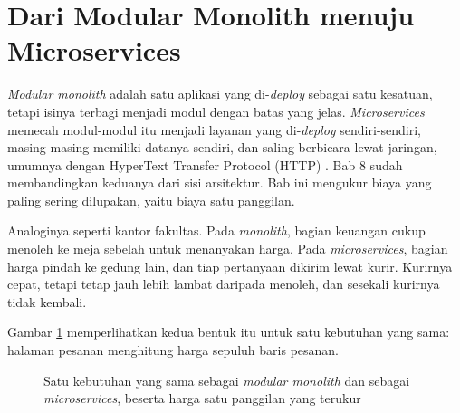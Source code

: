 \section{Dari Modular Monolith menuju Microservices}

\textit{Modular monolith} adalah satu aplikasi yang di-\textit{deploy}
sebagai satu kesatuan, tetapi isinya terbagi menjadi modul dengan batas yang
jelas. \textit{Microservices} memecah modul-modul itu menjadi layanan yang
di-\textit{deploy} sendiri-sendiri, masing-masing memiliki datanya sendiri,
dan saling berbicara lewat jaringan, umumnya dengan HyperText Transfer
Protocol (HTTP) \cite{newman2021microservices}. Bab 8
sudah membandingkan keduanya dari sisi arsitektur. Bab ini mengukur biaya yang
paling sering dilupakan, yaitu biaya satu panggilan.

Analoginya seperti kantor fakultas. Pada \textit{monolith}, bagian keuangan
cukup menoleh ke meja sebelah untuk menanyakan harga. Pada
\textit{microservices}, bagian harga pindah ke gedung lain, dan tiap
pertanyaan dikirim lewat kurir. Kurirnya cepat, tetapi tetap jauh lebih lambat
daripada menoleh, dan sesekali kurirnya tidak kembali.

Gambar \ref{fig:pecah14} memperlihatkan kedua bentuk itu untuk satu
kebutuhan yang sama: halaman pesanan menghitung harga sepuluh baris pesanan.

\begin{figure}[!htb]
  \centering
  \caption{Satu kebutuhan yang sama sebagai \textit{modular monolith} dan
           sebagai \textit{microservices}, beserta harga satu panggilan yang
           terukur}
  \label{fig:pecah14}
\end{figure}

